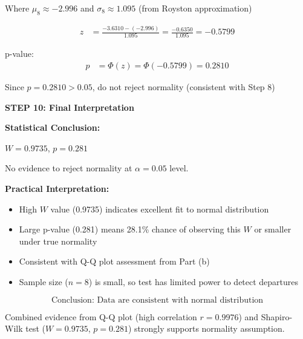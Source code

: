 \documentclass[12pt]{article}
\begin{document}
\begin{solution}
Where $\mu_8 \approx -2.996$ and $\sigma_8 \approx 1.095$ (from Royston approximation)

\begin{align*}
z &= \frac{-3.6310 - (-2.996)}{1.095} = \frac{-0.6350}{1.095} = -0.5799
\end{align*}

p-value:
\begin{align*}
p &= \Phi(z) = \Phi(-0.5799) = 0.2810
\end{align*}

Since $p = 0.2810 > 0.05$, do not reject normality (consistent with Step 8)

\textbf{STEP 10: Final Interpretation}

\textbf{Statistical Conclusion:}

$W = 0.9735$, $p = 0.281$

No evidence to reject normality at $\alpha = 0.05$ level.

\textbf{Practical Interpretation:}

\begin{itemize}
\item High $W$ value (0.9735) indicates excellent fit to normal distribution
\item Large p-value (0.281) means 28.1\% chance of observing this $W$ or smaller under true normality
\item Consistent with Q-Q plot assessment from Part (b)
\item Sample size ($n=8$) is small, so test has limited power to detect departures
\end{itemize}

\[\boxed{\text{Conclusion: Data are consistent with normal distribution}}\]

Combined evidence from Q-Q plot (high correlation $r = 0.9976$) and Shapiro-Wilk test ($W = 0.9735$, $p = 0.281$) strongly supports normality assumption.

\end{solution}
\end{document}
